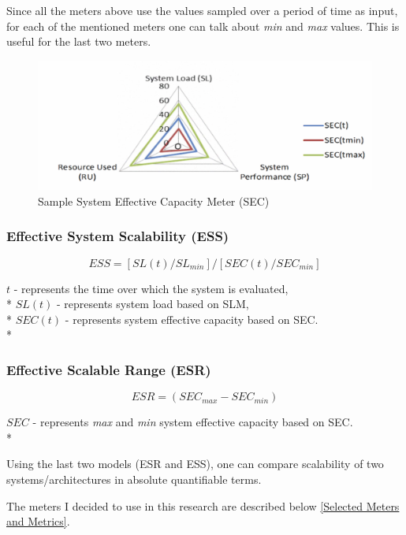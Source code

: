 \documentclass{uvamscse}
\begin{document}
Since all the meters above use the values sampled over a period of time as input, for each of the mentioned meters one can talk about \textit{min} and \textit{max} values. This is useful for the last two meters.

\begin{figure}[h]
\centering
\includegraphics[scale=0.3]{sec}
\caption{Sample System Effective Capacity Meter (SEC)}
\label{figure:sec}
\end{figure}

\subsubsection{Effective System Scalability (ESS)}
\begin{center}
  $$ESS = [SL(t) / SL_{min}] / [SEC(t) / SEC_{min}]$$
\end{center}
  \texttt{$t$} - represents the time over which the system is evaluated, \\*
  \texttt{$SL(t)$} - represents system load based on SLM, \\*
  \texttt{$SEC(t)$} - represents system effective capacity based on SEC. \\*

\subsubsection{Effective Scalable Range (ESR)}
\begin{center}
  $$ESR = (SEC_{max} - SEC_{min})$$
\end{center}
  \texttt{$SEC$} - represents \textit{max} and \textit{min} system effective capacity based on SEC. \\*

Using the last two models (ESR and ESS), one can compare scalability of two systems/architectures in absolute quantifiable terms.

The meters I decided to use in this research are described below \ref{Selected Meters and Metrics}.
\end{document}
